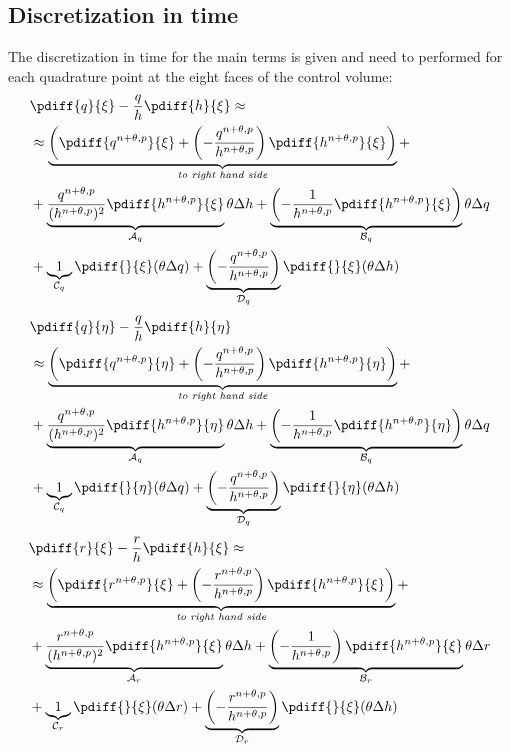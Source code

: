 \subsection{Discretization in time}
The discretization in time for the main terms is given and need to performed for each quadrature point at the eight faces of the control volume:
%
\begin{align}
    &\pdiff{q}{\xi} - \frac{q}{h}\pdiff{h}{\xi} \approx
    \\*
    & \approx
    \underbrace{ \left( \pdiff{q^{n+\theta,p}}{\xi} + \left(- \frac{q^{n+\theta,p}}{h^{n+\theta,p}}\right)   \pdiff{h^{n+\theta,p}}{\xi} \right)}_{\textit {to right hand side}} +
    \\*
    & + \underbrace{ \frac{q^{n+\theta,p}}{(h^{n+\theta,p})^2} \pdiff{h^{n+\theta,p}}{\xi} }_{{\cal{A}}_q}  \theta \Delta h
    + \underbrace{\left(-\frac{1}{h^{n+\theta,p}} \pdiff{h^{n+\theta,p}}{\xi} \right)}_{{\cal{B}}_q}  \theta \Delta q
    \\*
    & +
    \underbrace{1}_{{\cal{C}}_q} \pdiff{}{\xi}(\theta \Delta q) +
    \underbrace{\left(-\frac{q^{n+\theta,p}}{h^{n+\theta,p}}\right)}_{{\cal{D}}_q}
    \pdiff{}{\xi}(\theta \Delta h)
\end{align}
%
\begin{align}
    &\pdiff{q}{\eta} - \frac{q}{h}\pdiff{h}{\eta}
    \\
& \approx
\underbrace{ \left( \pdiff{q^{n+\theta,p}}{\eta} + \left(- \frac{q^{n+\theta,p}}{h^{n+\theta,p}}\right)  \pdiff{h^{n+\theta,p}}{\eta} \right)}_{\textit {to right hand side}} +
%
\\*
& + \underbrace{ \frac{q^{n+\theta,p}}{(h^{n+\theta,p})^2} \pdiff{h^{n+\theta,p}}{\eta} }_{{\cal{A}}_q} \theta \Delta h
+ \underbrace{\left(-\frac{1}{h^{n+\theta,p}} \pdiff{h^{n+\theta,p}}{\eta}  \right)}_{{\cal{B}}_q} \theta \Delta q
\\*
& +
\underbrace{1}_{{\cal{C}}_q} \pdiff{}{\eta}(\theta \Delta q) +
\underbrace{\left(-\frac{q^{n+\theta,p}}{h^{n+\theta,p}}\right)}_{{\cal{D}}_q}
\pdiff{}{\eta}(\theta \Delta h)
\end{align}
%
\begin{align}
        &\pdiff{r}{\xi} - \frac{r}{h}\pdiff{h}{\xi} \approx
    \\*
& \approx
\underbrace{ \left( \pdiff{r^{n+\theta,p}}{\xi} + \left(- \frac{r^{n+\theta,p}}{h^{n+\theta,p}}\right)   \pdiff{h^{n+\theta,p}}{\xi} \right)}_{\textit {to right hand side}} +
%
\\*
& + \underbrace{ \frac{r^{n+\theta,p}}{(h^{n+\theta,p})^2} \pdiff{h^{n+\theta,p}}{\xi} }_{{\cal{A}}_r} \theta \Delta h
+ \underbrace{\left(-\frac{1}{h^{n+\theta,p}} \right) \pdiff{h^{n+\theta,p}}{\xi} }_{{\cal{B}}_r} \theta \Delta r
\\*
& +
\underbrace{1}_{{\cal{C}}_r} \pdiff{}{\xi}(\theta \Delta r) +
\underbrace{\left(-\frac{r^{n+\theta,p}}{h^{n+\theta,p}}\right)}_{{\cal{D}}_r}
\pdiff{}{\xi}(\theta \Delta h)
\end{align}
